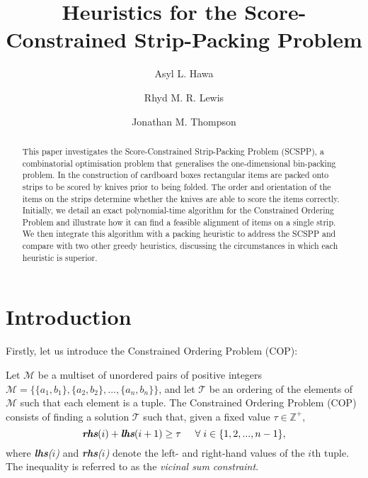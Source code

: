 \documentclass[oribibl]{llncs}
\begin{document}
	
\title{Heuristics for the Score-Constrained Strip-Packing Problem}
\author{Asyl L. Hawa \and Rhyd M. R. Lewis \and Jonathan M. Thompson}
\maketitle

\begin{abstract}
	This paper investigates the Score-Constrained Strip-Packing Problem (SCSPP), a combinatorial optimisation problem that generalises the one-dimensional bin-packing problem. In the construction of cardboard boxes rectangular items are packed onto strips to be scored by knives prior to being folded. The order and orientation of the items on the strips determine whether the knives are able to score the items correctly. Initially, we detail an exact polynomial-time algorithm for the Constrained Ordering Problem and illustrate how it can find a feasible alignment of items on a single strip. We then integrate this algorithm with a packing heuristic to address the SCSPP and compare with two other greedy heuristics, discussing the circumstances in which each heuristic is superior.
\end{abstract}

\section{Introduction}
\label{sec:intro}
Firstly, let us introduce the Constrained Ordering Problem (COP):

\begin{definition}
	\label{defn:cop}
	Let $\mathcal{M}$ be a multiset of unordered pairs of positive integers $\mathcal{M} = \{\{a_1, b_1\}, \{a_2,b_2\},...,\{a_n,b_n\}\}$, and let $\mathcal{T}$ be an ordering of the elements of $\mathcal{M}$ such that each element is a tuple. The Constrained Ordering Problem (COP) consists of finding a solution $\mathcal{T}$ such that, given a fixed value $\tau \in \mathbb{Z}^{+},$
	\begin{equation}
		\label{eqn:vsc}
		\emph{\textbf{rhs}}(i) + \emph{\textbf{lhs}}(i+1) \geq \tau \hspace{5mm} \forall \hspace{1mm} i \in \{1,2,..., n-1\},
	\end{equation}
	where \emph{\textbf{lhs}($i$)} and \emph{\textbf{rhs}($i$)} denote the left- and right-hand values of the $i$th tuple. The inequality is referred to as the \emph{vicinal sum constraint}.
\end{definition}
\end{document}
